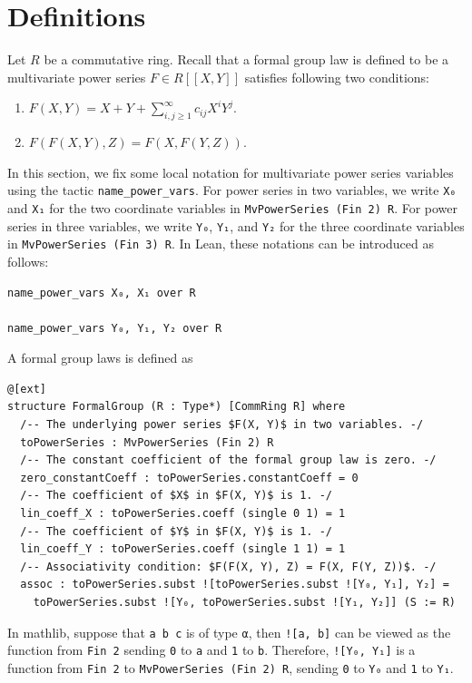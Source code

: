 \section{Definitions}

Let $R$ be a commutative ring. Recall that a formal group law is defined to be a multivariate power series
$F \in R[\![X,Y]\!]$ satisfies following two conditions:
\begin{enumerate}
  \item $F(X,Y) = X + Y + \sum_{i, j \ge 1}^{\infty} c_{ij} X ^ i Y ^ j$.
  \item $F(F(X,Y), Z) = F(X, F(Y,Z))$.
\end{enumerate}

In this section, we fix some local notation for multivariate
power series variables using the tactic \lstinline|name_power_vars|.
For power series in two variables, we write \lstinline|X₀| and
\lstinline|X₁| for the two coordinate variables in
\lstinline|MvPowerSeries (Fin 2) R|.  For power
series in three variables, we write \lstinline|Y₀|, \lstinline|Y₁|, and
\lstinline|Y₂| for the three coordinate variables in
\lstinline|MvPowerSeries (Fin 3) R|.
In Lean, these notations can be introduced as follows:
\begin{lstlisting}
name_power_vars X₀, X₁ over R

name_power_vars Y₀, Y₁, Y₂ over R
\end{lstlisting}

A formal group laws is defined as
\href{https://leanprover-community.github.io/mathlib4_docs/Mathlib/RingTheory/FormalGroup/Basic.html#FormalGroup}{\faExternalLink}
\begin{lstlisting}
@[ext]
structure FormalGroup (R : Type*) [CommRing R] where
  /-- The underlying power series $F(X, Y)$ in two variables. -/
  toPowerSeries : MvPowerSeries (Fin 2) R
  /-- The constant coefficient of the formal group law is zero. -/
  zero_constantCoeff : toPowerSeries.constantCoeff = 0
  /-- The coefficient of $X$ in $F(X, Y)$ is 1. -/
  lin_coeff_X : toPowerSeries.coeff (single 0 1) = 1
  /-- The coefficient of $Y$ in $F(X, Y)$ is 1. -/
  lin_coeff_Y : toPowerSeries.coeff (single 1 1) = 1
  /-- Associativity condition: $F(F(X, Y), Z) = F(X, F(Y, Z))$. -/
  assoc : toPowerSeries.subst ![toPowerSeries.subst ![Y₀, Y₁], Y₂] =
    toPowerSeries.subst ![Y₀, toPowerSeries.subst ![Y₁, Y₂]] (S := R)
\end{lstlisting}

In mathlib, suppose that \lstinline|a b c| is of type \lstinline|α|, then
\lstinline|![a, b]| can be viewed as the function from \lstinline|Fin 2|
sending \lstinline|0| to \lstinline|a| and \lstinline|1| to \lstinline|b|.
Therefore, \lstinline|![Y₀, Y₁]| is a function from \lstinline|Fin 2| to
\lstinline|MvPowerSeries (Fin 2) R|, sending \lstinline|0| to
\lstinline|Y₀| and \lstinline|1| to \lstinline|Y₁|.

